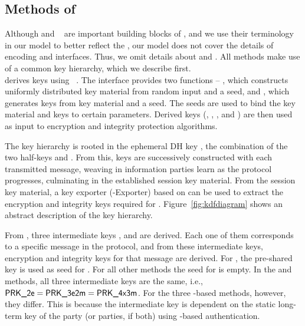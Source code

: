  
\subsection{Methods of \mEdhoc{}}
\label{sec:methods}
 
Although \mCbor{} and \mCose{}~\cite{rfc8152} are important building blocks of
\mEdhoc{}, and we use their terminology in our \mTamarin{} model to better
reflect the \mSpec{}, our model does not cover the details of encoding and
\mCose{} interfaces.
%
Thus, we omit details about \mCbor{} and \mCose{}.
%
All methods make use of a common key hierarchy, which we describe first.
%
\\

\mEdhoc{} derives keys using \mHkdf{}~\cite{rfc5869}.
%
The \mHkdf{} interface provides two functions -- \mHkdfExtract{}, which
constructs uniformly distributed key material from random input and a seed,
and \mHkdfExpand{}, which generates keys from key material and a seed.
%
The seeds are used to bind the key material and keys to certain parameters.
%
Derived keys (\mKtwoe, \mKtwom{}, \mKthreeae, and \mKthreem) are then used as
input to encryption and integrity protection algorithms.
%

The key hierarchy is rooted in the ephemeral DH key \mGxy{}, the combination
of the two half-keys \mGx{} and \mGy{}.
%
From this, keys are successively constructed with each transmitted message,
weaving in information parties learn as the protocol progresses, culminating
in the established session key material.
%
From the session key material, a key exporter (\mEdhoc-Exporter) based on
\mHkdf{} can be used to extract the encryption and integrity keys required
for \mOscore{}.
%
Figure~\ref{fig:kdfdiagram} shows an abstract description of the key hierarchy.
%

From \mGxy{}, three intermediate keys \mPRKtwo, \mPRKthree{} and
\mPRKthree{} are derived.
%
Each one of them corresponds to a specific message in the protocol, and from
these intermediate keys, encryption and integrity keys for that message are
derived.
%
For \mPskPsk{}, the pre-shared key is used as seed for \mPRKtwo.
%
For all other methods the seed for \mPRKtwo{} is empty.
%
In the \mPskPsk{} and \mSigSig{} methods, all three intermediate keys
are the same, i.e., $\textsf{PRK\_2e}{} = \textsf{PRK\_3e2m}{} = \textsf{PRK\_4x3m}$.
%
For the three \mStat-based methods, however, they differ.
%
This is because the intermediate key \mPRKthree{} is dependent on the static
long-term key of the party (or parties, if both) using \mStat{}-based
authentication.
%

